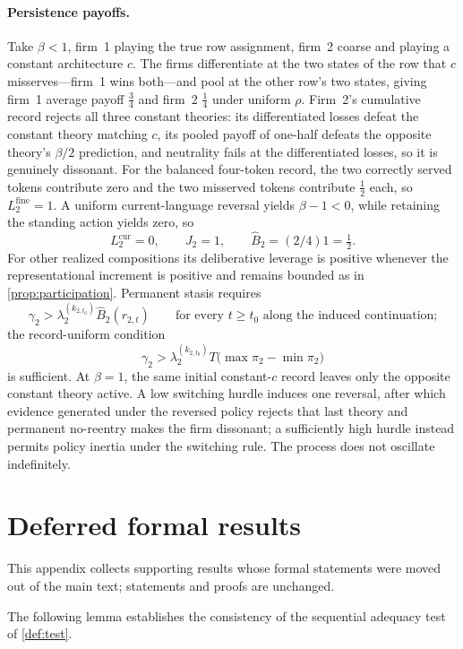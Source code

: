 \documentclass[11pt]{article}
\theoremstyle{definition}
\begin{document}
\paragraph{Persistence payoffs.}
Take $\beta<1$, firm~1 playing the true row assignment, firm~2 coarse and playing a constant architecture $c$.
The firms differentiate at the two states of the row that $c$ misserves---firm~1 wins both---and pool at the other row's two states, giving firm~1 average payoff $\tfrac34$ and firm~2 $\tfrac14$ under uniform $\rho$.
Firm~2's cumulative record rejects all three constant theories: its differentiated losses defeat the constant theory matching $c$, its pooled payoff of one-half defeats the opposite theory's $\beta/2$ prediction, and neutrality fails at the differentiated losses, so it is genuinely dissonant.
For the balanced four-token record, the two correctly served tokens contribute zero and the two misserved tokens contribute $\tfrac12$ each, so $L_2^{\mathrm{fine}}=1$.
A uniform current-language reversal yields $\beta-1<0$, while retaining the standing action yields zero, so
\[
L_2^{\mathrm{cur}}=0,\qquad
J_2=1,\qquad
\widehat B_2=(2/4)1=\tfrac12.
\]
For other realized compositions its deliberative leverage is positive whenever the representational increment is positive and remains bounded as in \cref{prop:participation}.
Permanent stasis requires
\[
\gamma_2
>
\lambda_2^{(k_{2,t_0})}
\widehat B_2(r_{2,t})
\qquad
\text{for every \(t\ge t_0\) along the induced continuation;}
\]
the record-uniform condition
\[
\gamma_2
>
\lambda_2^{(k_{2,t_0})}
T\bigl(\max\pi_2-\min\pi_2\bigr)
\]
is sufficient.
At \(\beta=1\), the same initial constant-\(c\) record leaves only the opposite constant theory active.
A low switching hurdle induces one reversal, after which evidence generated under the reversed policy rejects that last theory and permanent no-reentry makes the firm dissonant; a sufficiently high hurdle instead permits policy inertia under the switching rule.
The process does not oscillate indefinitely.

\section{Deferred formal results}
\label{app:deferred}

This appendix collects supporting results whose formal statements were moved out of the main text; statements and proofs are unchanged.

The following lemma establishes the consistency of the sequential adequacy test of \cref{def:test}.
\end{document}
